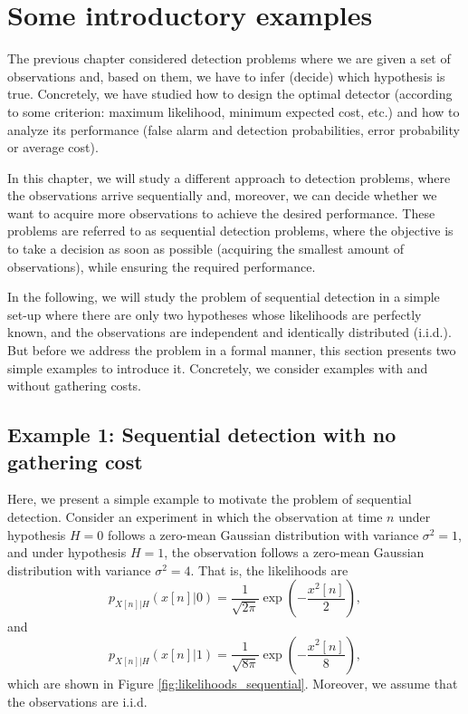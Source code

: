 \section{Some introductory examples}

The previous chapter considered detection problems where we are given a set of observations and, based on them, we have to infer (decide) which hypothesis is true. Concretely, we have studied how to design the optimal detector (according to some criterion: maximum likelihood, minimum expected cost, etc.) and how to analyze its performance (false alarm and detection probabilities, error probability or average cost). 

In this chapter, we will study a different approach to detection problems, where the observations arrive sequentially and, moreover, we can decide whether we want to acquire more observations to achieve the desired performance. These problems are referred to as sequential detection problems, where the objective is to take a decision as soon as possible (acquiring the smallest amount of observations), while ensuring the required performance. 

In the following, we will study the problem of sequential detection in a simple set-up where there are only two hypotheses whose likelihoods are perfectly known, and the observations are independent and identically distributed (i.i.d.). But before we address the problem in a formal manner, this section presents two simple examples to introduce it. Concretely, we consider examples with and without gathering costs.

\subsection{Example 1: Sequential detection with no gathering cost}

Here, we present a simple example to motivate the problem of sequential detection. Consider an experiment in which the observation at time $n$ under hypothesis $H = 0$ follows a zero-mean Gaussian distribution with variance $\sigma^2 = 1$, and under hypothesis $H = 1$, the observation follows a zero-mean Gaussian distribution with variance $\sigma^2 = 4$. That is, the likelihoods are
\begin{equation}
	\label{eq:likelihood_0}
	p_{X[n] | H} (x[n] | 0) = \frac{1}{\sqrt{2 \pi}} \exp \left(-\frac{x^2[n]}{2}\right),
\end{equation}
and
\begin{equation}
	\label{eq:likelihood_1}
	p_{X[n] | H} (x[n] | 1) = \frac{1}{\sqrt{8 \pi}} \exp \left(-\frac{x^2[n]}{8}\right),
\end{equation}
which are shown in Figure \ref{fig:likelihoods_sequential}. Moreover, we assume that the observations are i.i.d.

